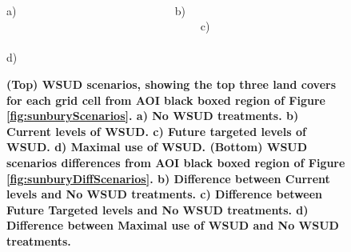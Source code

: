 \documentclass[final,3p,times,authoryear]{elsarticle}
\begin{document}
\begin{figure}[!htbp]
\\ a) ~~~~~~~~~~~~~~~~~~~~~~~~~~~    b)   ~~~~~~~~~~~~~~~~~~~~~~~~~~~~~~~~~~  c) ~~~~~~~~~~~~~~~~~~~~~~~~~~~~~~~~~~  d)~~~~~~~~~~~~~~~~~~~~~~~~~~~~~
\caption{\bf (Top) WSUD scenarios, showing the top three land covers for each grid cell from AOI black boxed region of Figure \ref{fig:sunburyScenarios}. a) No WSUD treatments. b) Current levels of WSUD. c) Future targeted levels of WSUD. d) Maximal use of WSUD. 
(Bottom) WSUD scenarios differences from AOI black boxed region of Figure \ref{fig:sunburyDiffScenarios}. b) Difference between Current levels and No WSUD treatments. c) Difference between Future Targeted levels and No WSUD treatments. d) Difference between Maximal use of WSUD and No WSUD treatments.}    
 \label{fig:sunburyScenariosAOI} 
\end{figure} 
\end{document}
